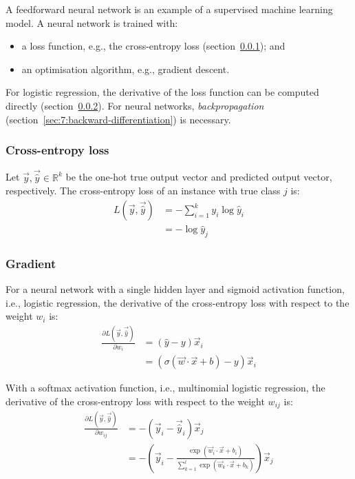 A feedforward neural network is an example of a supervised machine learning model.
A neural network is trained with:
\begin{itemize}
  \item a loss function, e.g., the cross-entropy loss
        (section~\ref{sec:7:cross-entropy-loss}); and
  \item an optimisation algorithm, e.g., gradient descent.
\end{itemize}
For logistic regression, the derivative of the loss function can be computed
directly (section~\ref{sec:7:gradient}).
For neural networks, \textit{backpropagation}
(section~\ref{sec:7:backward-differentiation}) is necessary.

\subsubsection{Cross-entropy loss}
\label{sec:7:cross-entropy-loss}

\begin{dfn}
  Let $\vec{y}, \vec{\hat{y}} \in \mathbb{R}^k$ be the one-hot true output
  vector and predicted output vector, respectively.
  The cross-entropy loss of an instance with true class $j$ is:
  \begin{align}
    L(\vec{y}, \vec{\hat{y}})
     & = -\sum_{i = 1}^{k} y_i \log \hat{y}_i \\
     & = -\log \hat{y}_j
  \end{align}
\end{dfn}

\subsubsection{Gradient}
\label{sec:7:gradient}

For a neural network with a single hidden layer and sigmoid activation function,
i.e., logistic regression, the derivative of the cross-entropy loss with respect
to the weight $w_i$ is:
\begin{align*}
  \frac{\partial L(\vec{y}, \vec{\hat{y}})}{\partial w_i}
   & = (\hat{y} - y) \vec{x}_i                           \\
   & = (\sigma(\vec{w} \cdot \vec{x} + b) - y) \vec{x}_i
\end{align*}

With a softmax activation function, i.e., multinomial logistic regression, the
derivative of the cross-entropy loss with respect to the weight $w_{ij}$ is:
\begin{align*}
  \frac{\partial L(\vec{y}, \vec{\hat{y}})}{\partial w_{ij}}
   & = - (\vec{y}_i - \vec{\hat{y}}_i) \vec{x}_j \\
   & = - \left(
  \vec{y}_i -
  \frac{ \exp(\vec{w}_i \cdot \vec{x} + b_i)}{\sum_{k = 1}^{l} \exp(\vec{w}_k \cdot \vec{x} + b_k)}
  \right) \vec{x}_j
\end{align*}

